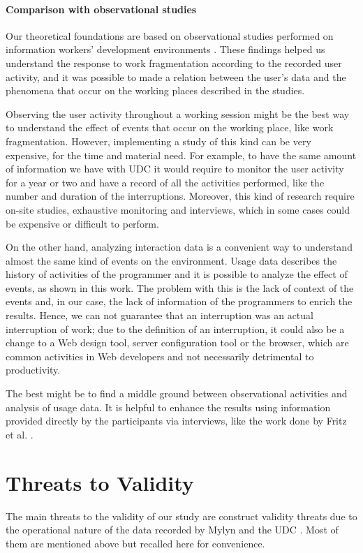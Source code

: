 \documentclass[times]{smrauth}
\begin{document}
\paragraph{Comparison with observational studies}
Our theoretical foundations are based on observational studies performed on information workers' development environments \cite{MGH05, IH07, LVD06, PD10}. These findings helped us understand the response to work fragmentation according to the recorded user activity, and it was possible to made a relation between the user's data and the phenomena that occur on the working places described in the studies.

Observing the user activity throughout a working session might be the best way to understand the effect of events that occur on the working place, like work fragmentation. However, implementing a study of this kind can be very expensive, for the time and material need. For example, to have the same amount of information we have with UDC it would require to monitor the user activity for a year or two and have a record of all the activities performed, like the number and duration of the interruptions. Moreover, this kind of research require on-site studies, exhaustive monitoring and interviews, which in some cases could be expensive or difficult to perform.

On the other hand, analyzing interaction data is a convenient way to understand almost the same kind of events on the environment. Usage data describes the history of activities of the programmer and it is possible to analyze the effect of events, as shown in this work. The problem with this is the lack of context of the events and, in our case, the lack of information of the programmers to enrich the results. Hence, we can not guarantee that an interruption was an actual interruption of work; due to the definition of an interruption, it could also be a change to a Web design tool, server configuration tool or the browser, which are common activities in Web developers and not necessarily detrimental to productivity.

The best might be to find a middle ground between observational activities and analysis of usage data. It is helpful to enhance the results using information provided directly by the participants via interviews, like the work done by Fritz et al. \cite{FMH07}.

\section{Threats to Validity}
The main threats to the validity of our study are construct validity threats due to the operational nature of the data recorded by Mylyn and the UDC \cite{M14}. Most of them are mentioned above but recalled here for convenience.
\end{document}
